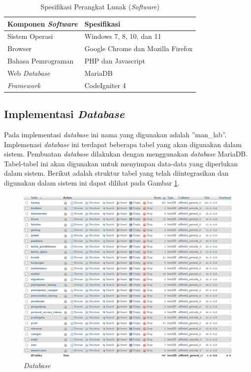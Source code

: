 \begin{table}[h]
	\centering
	\caption{Spesifikasi Perangkat Lunak (\textit{Software})}
	\begin{tabular}{|l|l|}
		\hline
		\textbf{Komponen \textit{Software}} & \textbf{Spesifikasi}              \\ \hline
		Sistem Operasi                      & Windows 7, 8, 10, dan 11          \\ \hline
		Browser                             & Google Chrome dan Mozilla Firefox \\ \hline
		Bahasa Pemrograman                  & PHP dan Javascript                \\ \hline
		Web \textit{Database}               & MariaDB                           \\ \hline
		\textit{Framework}                  & CodeIgniter 4                     \\ \hline
	\end{tabular}
\end{table}

\subsection{Implementasi \textit{Database}}
Pada implementasi \textit{database} ini nama yang digunakan adalah ”man\_lab”. Implemenasi \textit{database} ini terdapat beberapa tabel yang akan digunakan dalam sistem. Pembuatan \textit{database} dilakukan dengan menggunakan \textit{database} MariaDB. Tabel-tabel ini akan digunakan untuk menyimpan data-data yang diperlukan dalam sistem. Berikut adalah struktur tabel yang telah diintegrasikan dan digunakan dalam sistem ini dapat dilihat pada Gambar \ref{database-manlab}.

\begin{figure}
	\centering
	\includegraphics[width=1\textwidth]{konten/gambar/implementasi/database.png}
	\caption{\textit{Database}}
	\label{database-manlab}
\end{figure}

